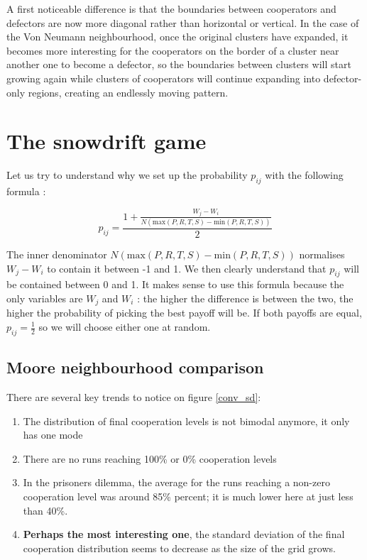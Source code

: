 \documentclass[a4paper]{article}
\begin{document}
A first noticeable difference is that the boundaries between cooperators and
defectors are now more diagonal rather than horizontal or vertical. In the 
case of the Von Neumann neighbourhood, once the original clusters have 
expanded, it becomes more interesting for the cooperators on the border of
a cluster near another one to become a defector, so the boundaries between
clusters will start growing again while clusters of cooperators will continue
expanding into defector-only regions, creating an endlessly moving pattern.


\section{The snowdrift game}
Let us try to understand why we set up the probability $p_{ij}$ with the
following formula :

$$ p_{ij} = \frac{
	1 + \frac{W_j-W_i}{N(\text{max}(P,R,T,S)-\text{min}(P,R,T,S))}
	}
	{2}$$

The inner denominator $N(\text{max}(P,R,T,S)-\text{min}(P,R,T,S))$
normalises $W_j-W_i$ to contain it between -1 and 1. We then clearly 
understand that $p_{ij}$ will be contained between 0 and 1. It makes sense
to use this formula because the only variables are $W_j$ and $W_i$ : the higher
the difference is between the two, the higher the probability of picking the 
best payoff will be. If both payoffs are equal, $p_{ij} = \frac{1}{2}$ so 
we will choose either one at random.

\subsection{Moore neighbourhood comparison}
There are several key trends to notice on figure \ref{conv_sd}:
\begin{enumerate}
	\item The distribution of final cooperation levels is not bimodal
		anymore, it only has one mode
	\item There are no runs reaching 100\% or 0\% cooperation levels
	\item In the prisoners dilemma, the average for the runs reaching a
		non-zero cooperation level was around 85\% percent; it is 
		much lower here at just less than 40\%.
	\item \textbf{Perhaps the most interesting one}, the standard 
		deviation of the final cooperation distribution seems to
		decrease as the size of the grid grows.
\end{enumerate}
\end{document}
